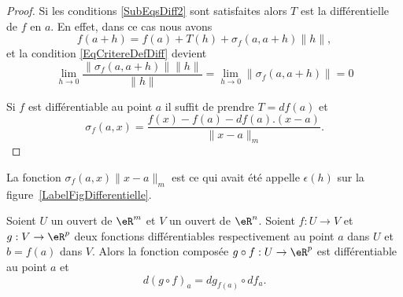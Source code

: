 \begin{proof}
	Si les conditions \eqref{SubEqsDiff2} sont satisfaites alors \( T\) est la différentielle de \( f\) en \( a\). En effet, dans ce cas nous avons
	\begin{equation}
		f(a+h)=f(a)+T(h)+\sigma_f(a,a+h)\| h \|,
	\end{equation}
	et la condition \eqref{EqCritereDefDiff} devient
	\begin{equation}
		\lim_{h\to 0} \frac{ \| \sigma_f(a,a+h) \|\| h \| }{ \| h \| }=\lim_{h\to 0} \| \sigma_f(a,a+h)\| =0
	\end{equation}


	Si \( f\) est différentiable au point \( a\) il suffit de prendre \( T=df(a)\) et
	\[
		\sigma_f(a,x)=\frac{f(x)-f(a)-df(a).(x-a)}{\|x-a\|_m}.
	\]
\end{proof}

\begin{remark}
	La fonction \( \sigma_f(a,x)\| x-a \|_m\) est ce qui avait été appelle \( \epsilon(h)\) sur la figure~\ref{LabelFigDifferentielle}.
\end{remark}

\begin{proposition}		\label{PropDiffCompose}
	Soient \( U\) un ouvert de \( \eR^m\) et \( V\) un ouvert de \( \eR^n\). Soient \( f: U\to V\)  et \( g: V \to \eR^p\) deux fonctions différentiables respectivement au point \( a\) dans \( U\) et \( b=f(a)\) dans \( V\). Alors la fonction composée \( g\circ f: U\to \eR^p \) est différentiable au point \( a\) et
	\begin{equation}	\label{EqDiffCompose}
		d(g\circ f)_a=dg_{f(a)}\circ df_a.
	\end{equation}
\end{proposition}

